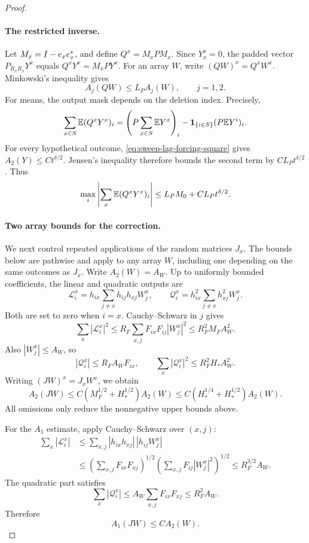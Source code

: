 \begin{proof}
\paragraph{The restricted inverse.}
Let \(M_x=I-e_xe_x^*\), and define
\(Q^x=M_xPM_x\).  Since \(Y_x^x=0\), the padded vector
\(P_{R_xR_x}Y^x\) equals \(Q^xY^x=M_xPY^x\).  For an array \(W\),
write \((QW)^x=Q^xW^x\).  Minkowski's inequality gives
\begin{equation}\label{eq:sweep-lag-inverse-arrays}
 A_j(QW)\le L_P A_j(W),\qquad j=1,2.
\end{equation}
For means, the output mask depends on the deletion index.  Precisely,
\[
 \sum_{x\in S}\mathbb E(Q^xY^x)_i
 =\left(P\sum_{x\in S}\mathbb E Y^x\right)_i
   -\boldsymbol{1}_{\{i\in S\}}(P\mathbb E Y^i)_i.
\]
For every hypothetical outcome, \eqref{eq:sweep-lag-forcing-square}
gives \(A_2(Y)\le Ct^{\delta/2}\). Jensen's inequality therefore
bounds the second term by \(CL_Pt^{\delta/2}\). Thus
\begin{equation}\label{eq:sweep-lag-mask}
 \max_i\left|\sum_x\mathbb E(Q^xY^x)_i\right|
 \le L_P M_0+CL_Pt^{\delta/2}.
\end{equation}

\paragraph{Two array bounds for the correction.}
We next control repeated applications of the random matrices \(J_x\).
The bounds below are pathwise and apply to any array \(W\), including
one depending on the same outcomes as \(J_x\).  Write \(A_2(W)=A_W\).
Up to uniformly bounded coefficients, the linear and quadratic outputs
are
\[
 \mathcal L_i^x=h_{ix}\sum_{j\ne x}h_{ij}h_{xj}W_j^x,
 \qquad
 \mathcal Q_i^x=h_{ix}^2\sum_{j\ne x}h_{xj}^2W_j^x.
\]
Both are set to zero when \(i=x\).  Cauchy--Schwarz in \(j\) gives
\[
 \sum_x|\mathcal L_i^x|^2
 \le R_F\sum_{x,j}F_{ix}F_{ij}|W_j^x|^2
 \le R_F^2M_FA_W^2.
\]
Also \(|W_j^x|\le A_W\), so
\[
 |\mathcal Q_i^x|\le R_FA_WF_{ix},\qquad
 \sum_x|\mathcal Q_i^x|^2\le R_F^2H_*A_W^2.
\]
Writing \((JW)^x=J_xW^x\), we obtain
\begin{equation}\label{eq:sweep-lag-J-square}
 A_2(JW)\le C(M_F^{1/2}+H_*^{1/2})A_2(W)
          \le C(H_*^{1/4}+H_*^{1/2})A_2(W).
\end{equation}
All omissions only reduce the nonnegative upper bounds above.

For the \(A_1\) estimate, apply Cauchy--Schwarz over \((x,j)\):
\[
\begin{split}
 \sum_x|\mathcal L_i^x|
 &\le\sum_{x,j}|h_{ix}h_{xj}|\,|h_{ij}W_j^x|\\
 &\le\left(\sum_{x,j}F_{ix}F_{xj}\right)^{1/2}
       \left(\sum_{x,j}F_{ij}|W_j^x|^2\right)^{1/2}
 \le R_F^{3/2}A_W.
\end{split}
\]
The quadratic part satisfies
\[
 \sum_x|\mathcal Q_i^x|
 \le A_W\sum_{x,j}F_{ix}F_{xj}\le R_F^2A_W.
\]
Therefore
\begin{equation}\label{eq:sweep-lag-J-sum}
 A_1(JW)\le CA_2(W).
\end{equation}


\end{proof}
